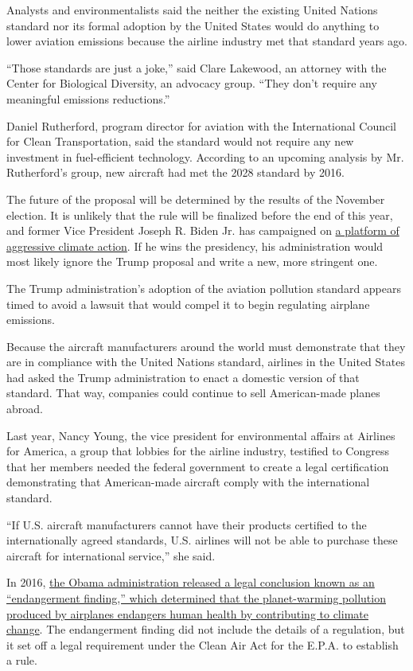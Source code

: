 Analysts and environmentalists said the neither the existing United
Nations standard nor its formal adoption by the United States would do
anything to lower aviation emissions because the airline industry met
that standard years ago.

``Those standards are just a joke,'' said Clare Lakewood, an attorney
with the Center for Biological Diversity, an advocacy group. ``They
don't require any meaningful emissions reductions.''

Daniel Rutherford, program director for aviation with the International
Council for Clean Transportation, said the standard would not require
any new investment in fuel-efficient technology. According to an
upcoming analysis by Mr. Rutherford's group, new aircraft had met the
2028 standard by 2016.

The future of the proposal will be determined by the results of the
November election. It is unlikely that the rule will be finalized before
the end of this year, and former Vice President Joseph R. Biden Jr. has
campaigned on
\href{https://www.nytimes3xbfgragh.onion/2020/07/15/climate/trump-biden-environment.html}{a
platform of aggressive climate action}. If he wins the presidency, his
administration would most likely ignore the Trump proposal and write a
new, more stringent one.

The Trump administration's adoption of the aviation pollution standard
appears timed to avoid a lawsuit that would compel it to begin
regulating airplane emissions.

Because the aircraft manufacturers around the world must demonstrate
that they are in compliance with the United Nations standard, airlines
in the United States had asked the Trump administration to enact a
domestic version of that standard. That way, companies could continue to
sell American-made planes abroad.

Last year, Nancy Young, the vice president for environmental affairs at
Airlines for America, a group that lobbies for the airline industry,
testified to Congress that her members needed the federal government to
create a legal certification demonstrating that American-made aircraft
comply with the international standard.

``If U.S. aircraft manufacturers cannot have their products certified to
the internationally agreed standards, U.S. airlines will not be able to
purchase these aircraft for international service,'' she said.

In 2016,
\href{https://www.nytimes3xbfgragh.onion/2016/07/26/us/politics/epa-airplane-pollution.html}{the
Obama administration released a legal conclusion known as an
``endangerment finding,'' which determined that the planet-warming
pollution produced by airplanes endangers human health by contributing
to climate change}. The endangerment finding did not include the details
of a regulation, but it set off a legal requirement under the Clean Air
Act for the E.P.A. to establish a rule.

